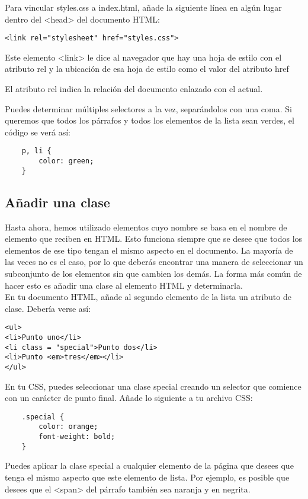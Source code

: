\begin{enumerate}
Para vincular styles.css a index.html, añade la siguiente línea en algún lugar dentro del <head> del documento HTML:

\begin{lstlisting}
<link rel="stylesheet" href="styles.css">
\end{lstlisting}

Este elemento <link> le dice al navegador que hay una hoja de estilo con el atributo rel y la ubicación de esa hoja de estilo como el valor del atributo href
\begin{remark}
	El atributo rel indica la relación del documento enlazado con el actual.
\end{remark}

Puedes determinar múltiples selectores a la vez, separándolos con una coma. Si queremos que todos los párrafos y todos los elementos de la lista sean verdes, el código se verá así:

\begin{lstlisting}
	p, li {
		color: green;
	}
\end{lstlisting}

\subsection{Añadir una clase}
Hasta ahora, hemos utilizado elementos cuyo nombre se basa en el nombre de elemento que reciben en HTML. Esto funciona siempre que se desee que todos los elementos de ese tipo tengan el mismo aspecto en el documento. La mayoría de las veces no es el caso, por lo que deberás encontrar una manera de seleccionar un subconjunto de los elementos sin que cambien los demás. La forma más común de hacer esto es añadir una clase al elemento HTML y determinarla.
\\
En tu documento HTML, añade al segundo elemento de la lista un atributo de clase. Debería verse así:
\begin{lstlisting}
<ul>
<li>Punto uno</li>
<li class = "special">Punto dos</li>
<li>Punto <em>tres</em></li>
</ul>
\end{lstlisting}
En tu CSS, puedes seleccionar una clase special creando un selector que comience con un carácter de punto final. Añade lo siguiente a tu archivo CSS:
\begin{lstlisting}
	.special {
		color: orange;
		font-weight: bold;
	}
\end{lstlisting}

Puedes aplicar la clase special a cualquier elemento de la página que desees que tenga el mismo aspecto que este elemento de lista. Por ejemplo, es posible que desees que el <span> del párrafo también sea naranja y en negrita. 


\end{enumerate}
